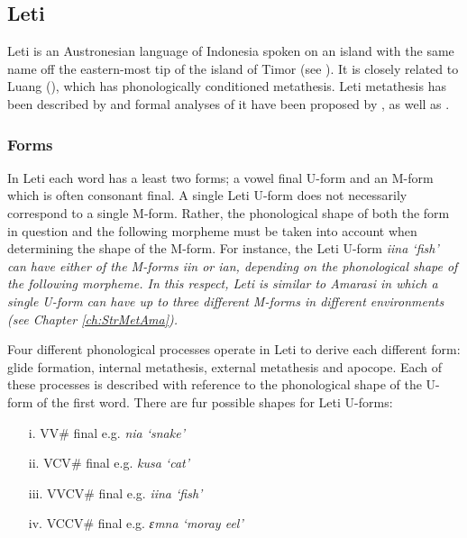 \subsection{Leti}\label{sec:Let}
Leti is an Austronesian language of Indonesia spoken on an island
with the same name off the eastern-most tip of the island of Timor
(see ).
It is closely related to Luang (),
which has phonologically conditioned metathesis.
Leti metathesis has been described by \citet{en94,en96,en04}
and formal analyses of it have been proposed by \cite{huen95},
as well as \cite{hu98}.

\subsubsection{Forms}\label{sec:LetFor}
In Leti each word has a least two forms;
a vowel final U-form and an M-form which is often consonant final.
A single Leti U-form does not necessarily correspond to a single M-form.
Rather, the phonological shape of both the form in question
and the following morpheme must be taken into account when determining the shape of the M-form.
For instance, the Leti U-form \it{iina} `fish'
can have either of the M-forms \it{iin} or \it{ian},
depending on the phonological shape of the following morpheme.
In this respect, Leti is similar to Amarasi in which a single
U-form can have up to three different M-forms in different environments (see Chapter \ref{ch:StrMetAma}).

Four different phonological processes operate in Leti to derive each different form:
glide formation, internal metathesis, external metathesis and apocope.
Each of these processes is described with reference to the phonological shape of the U-form of the first word.
There are fur possible shapes for Leti U-forms:

\begin{itemize}
	\item[i.] VV{\#} final e.g. \it{nia} `snake'
	\item[ii.] VCV{\#} final e.g. \it{kusa} `cat'
	\item[iii.] V{}V{}CV{\#} final e.g. \it{iina} `fish'
	\item[iv.] VCCV{\#} final e.g. \it{ɛmna} `moray eel'
\end{itemize}

